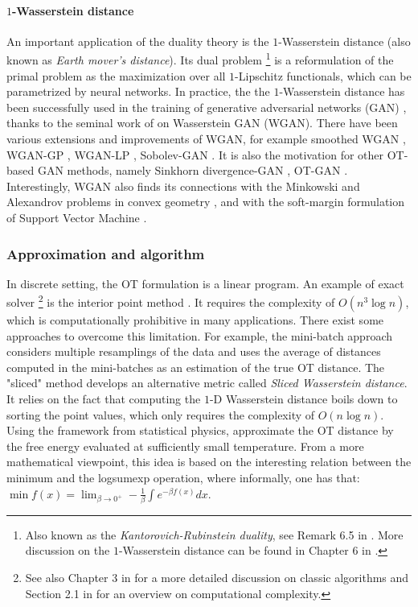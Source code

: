 \paragraph{$1$-Wasserstein distance}
An important application of the duality theory is the $1$-Wasserstein distance
(also known as \textit{Earth mover's distance}). Its dual problem
\footnote{Also known as the \textit{Kantorovich-Rubinstein duality}, see Remark 6.5
in \citep{Villani08}. More discussion on the $1$-Wasserstein distance can be found
in Chapter 6 in \citep{Peyre19}.}
is a reformulation of the primal problem as the maximization over all $1$-Lipschitz functionals,
which can be parametrized by neural networks.
In practice, the the $1$-Wasserstein distance has been successfully used
in the training of generative adversarial networks (GAN) \citep{Goodfellow14},
thanks to the seminal work of \citep{Arjovsky17} on Wasserstein GAN (WGAN).
There have been various extensions and improvements of WGAN, for example
smoothed WGAN \citep{Sanjabi18}, WGAN-GP \citep{Gulrajani17}, WGAN-LP \citep{Petzka18},
Sobolev-GAN \citep{Mroueh17}. It is also the motivation for other OT-based GAN methods, namely
Sinkhorn divergence-GAN \citep{Genevay18a}, OT-GAN \citep{Salimans18}.
Interestingly, WGAN also finds its connections with the Minkowski and Alexandrov problems
in convex geometry \citep{Lei19}, and with the soft-margin formulation of
Support Vector Machine \citep{Jolicoeur19}.

\subsubsection{Approximation and algorithm}
In discrete setting, the OT formulation is a linear program.
An example of exact solver \footnote{See also Chapter 3 in \citep{Peyre19}
for a more detailed discussion on classic algorithms and Section 2.1 in \citep{Pele09}
for an overview on computational complexity.}
is the interior point method \citep{Orlin88}. It requires the complexity of $O(n^3 \log n)$,
which is computationally prohibitive in many applications.
There exist some approaches to overcome this limitation. For example, the mini-batch approach
\citep{Sommerfeld19,Fatras20} considers multiple resamplings of the data and
uses the average of distances computed in the mini-batches as an estimation of the true OT distance.
The "sliced" method \citep{Rabin12,Bonneel15} develops an alternative metric
called \textit{Sliced Wasserstein distance}.
It relies on the fact that computing the $1$-D Wasserstein distance boils down to sorting the
point values, which only requires the complexity of $O(n \log n)$.
Using the framework from statistical physics, \citep{Koehl19}
approximate the OT distance by the free energy evaluated at sufficiently small temperature.
From a more mathematical viewpoint, this idea is based on the interesting relation
between the minimum and the logsumexp operation, where informally, one has that:
$\min f(x) = \lim_{\beta \to 0^+} -\frac{1}{\beta} \int e^{-\beta f(x)} dx$.

